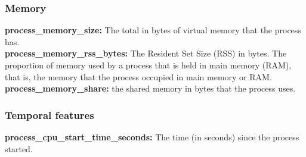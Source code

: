 \documentclass{iosart2c}
\begin{document}
\subsubsection{Memory}

\textbf{process\_memory\_size:} The total in bytes of virtual memory that the process has.\\

\textbf{process\_memory\_rss\_bytes:} The Resident Set Size (RSS) in bytes. The proportion of memory used by a process that is held in main memory (RAM), that is, the memory that the process occupied in main memory or RAM.\\

\textbf{process\_memory\_share:} the shared memory in bytes that the process uses.\\

\subsubsection{Temporal features}

\textbf{process\_cpu\_start\_time\_seconds:} The time (in seconds) since the process started.\\







%
%

%
\end{document}
